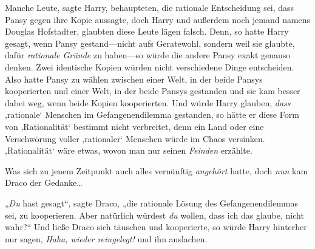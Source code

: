 Manche Leute, sagte Harry, behaupteten, die rationale Entscheidung sei, dass Pansy gegen ihre Kopie aussagte, doch Harry und außerdem noch jemand namens Douglas Hofstadter, glaubten diese Leute lägen falsch. Denn, so hatte Harry gesagt, wenn Pansy gestand—nicht aufs Geratewohl, sondern weil sie glaubte, dafür \emph{rationale Gründe} zu haben—so würde die andere Pansy exakt genauso denken. Zwei identische Kopien würden nicht verschiedene Dinge entscheiden. Also hatte Pansy zu wählen zwischen einer Welt, in der beide Pansys kooperierten und einer Welt, in der beide Pansys gestanden und sie kam besser dabei weg, wenn beide Kopien kooperierten. Und würde Harry glauben, \emph{dass} ‚rationale‘ Menschen im Gefangenendilemma gestanden, so hätte er diese Form von ‚Rationalität‘ bestimmt nicht verbreitet, denn ein Land oder eine Verschwörung voller ‚rationaler‘ Menschen würde im Chaos versinken. ‚Rationalität‘ wäre etwas, wovon man nur seinen \emph{Feinden} erzählte.

Was sich zu jenem Zeitpunkt auch alles vernünftig \emph{angehört} hatte, doch \emph{nun} kam Draco der Gedanke…

„\emph{Du} hast gesagt“, sagte Draco, „die rationale Lösung des Gefangenendilemmas sei, zu kooperieren. Aber natürlich würdest \emph{du} wollen, dass ich das glaube, nicht wahr?“ Und ließe Draco sich täuschen und kooperierte, so würde Harry hinterher nur sagen, \emph{Haha, wieder reingelegt!} und ihn auslachen.

